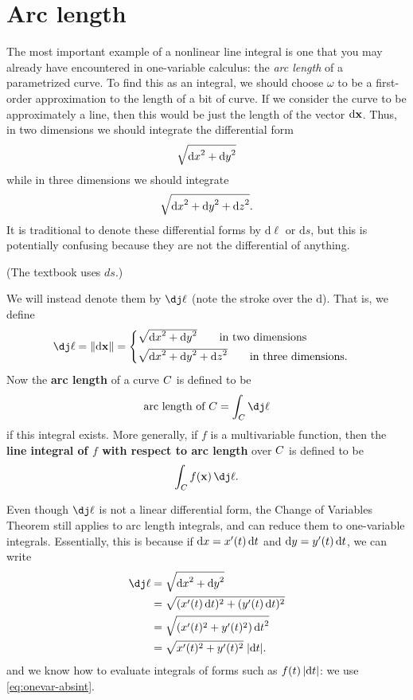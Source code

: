 \documentclass[12pt]{amsart}
\begin{document}

\section{Arc length}
\label{sec:arc-length}

The most important example of a nonlinear line integral is one that you may already have encountered in one-variable calculus: the \emph{arc length} of a parametrized curve.
To find this as an integral, we should choose $\omega$ to be a first-order approximation to the length of a bit of curve.
If we consider the curve to be approximately a line, then this would be just the length of the vector ${\mathrm{d} \mathbf{x}}$.
Thus, in two dimensions we should integrate the differential form
\[ \sqrt{{\mathrm{d} x}^2+{\mathrm{d} y}^2}\]
while in three dimensions we should integrate
\[ \sqrt{{\mathrm{d} x}^2+{\mathrm{d} y}^2 + {\mathrm{d} z}^2}.\]
It is traditional to denote these differential forms by $\mathrm{d}\ell$ or $\mathrm{d}s$, but this is potentially confusing because they are not the differential of anything.
\begin{stewart}(The textbook uses $ds$.)\end{stewart}
We will instead denote them by $\dl$ (note the stroke over the $\mathrm{d}$).
That is, we define
\[ \dl = \mgn{\dpx} =
\begin{cases}
  \sqrt{\dx^2+\dy^2}\qquad\text{in two dimensions}\\[3pt]
  \sqrt{\dx^2+\dy^2+\dz^2}\qquad\text{in three dimensions}.
\end{cases}\]
Now the \textbf{arc length} of a curve $C$ is defined to be
\[ \text{arc length of } \curve = \lint{\curve} \dl \]
if this integral exists.
More generally, if $f$ is a multivariable function, then the \textbf{line integral of $f$ with respect to arc length} over $C$ is defined to be
\[ \lint{\curve} f(\pt{x})\,\dl. \]

Even though $\dl$ is not a linear differential form, the Change of Variables Theorem still applies to arc length integrals, and can reduce them to one-variable integrals.
Essentially, this is because if ${\mathrm{d} x} = x'(t) \,{\mathrm{d} t}$ and ${\mathrm{d} y} = y'(t)\,{\mathrm{d} t}$, we can write
\begin{align*}
  \dl &= \sqrt{\dx^2+\dy^2}\\
  &= \sqrt{(x'(t)\,\dt)^2 + (y'(t)\,\dt)^2}\\
  &= \sqrt{(x'(t)^2 + y'(t)^2) \,\dt^2}\\
  &= \sqrt{x'(t)^2 + y'(t)^2} \;|\dt|.
\end{align*}
and we know how to evaluate integrals of forms such as $f(t)\,|{\mathrm{d} t}|$: we use \cref{eq:onevar-absint}.

\end{document}
